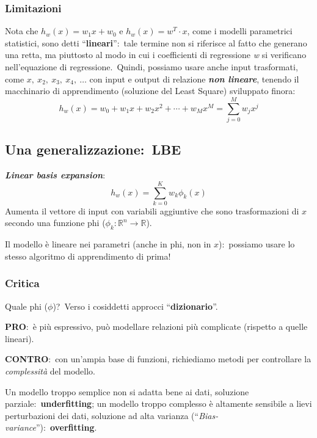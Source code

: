 \subsubsection{Limitazioni}

Nota che $h_w(x) = w_1 x + w_0$ e $h_w(x) = w^T \cdot x$, come i modelli parametrici statistici, sono detti ``\textbf{lineari}'':\ tale termine non si riferisce al fatto che generano una retta, ma piuttosto al modo in cui i coefficienti di regressione \textit{w} si verificano nell'equazione di regressione.\
Quindi, possiamo usare anche input trasformati, come $x,\ x_2,\ x_3,\ x_4,\ \dots$ con input e output di relazione \textbf{\textit{non lineare}}, tenendo il macchinario di apprendimento (soluzione del Least Square) sviluppato finora:
\[ h_w(x) = w_0 + w_1x + w_2 x^2 + \cdots + w_Mx^M = \sum_{j=0}^M w_j x^j\]

\subsection{Una generalizzazione:\ LBE}

\textbf{\textit{Linear basis expansion}}:
\[ h_w(x) = \sum_{k=0}^K w_k\phi_k(x) \]
Aumenta il vettore di input con variabili aggiuntive che sono trasformazioni di $x$ secondo una funzione phi ($\phi_k: \mathbb{R}^n \rightarrow \mathbb{R}$).\

\vspace{12pt}

\noindent Il modello è lineare nei parametri (anche in phi, non in $x$):\ possiamo usare lo stesso algoritmo di apprendimento di prima!

\subsubsection{Critica}
Quale phi ($\phi$)?\
Verso i cosiddetti approcci ``\textbf{dizionario}''.\
\begin{flushleft}
	\textbf{PRO}:\ è più espressivo, può modellare relazioni più complicate (rispetto a quelle lineari).

	\textbf{CONTRO}:\ con un'ampia base di funzioni, richiediamo metodi per controllare la \textit{complessità} del modello.
\end{flushleft}

\noindent Un modello troppo semplice non si adatta bene ai dati, soluzione parziale:\ \textbf{underfitting}; un modello troppo complesso è altamente sensibile a lievi perturbazioni dei dati, soluzione ad alta varianza (``\textit{Bias-variance}''):\ \textbf{overfitting}.\

